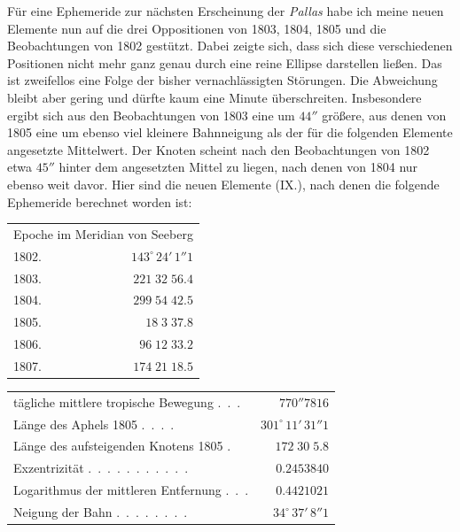 \par\indent Für eine Ephemeride zur nächsten Erscheinung der \emph{Pallas} habe ich meine neuen Elemente nun auf die drei Oppositionen von 1803, 1804, 1805 und die Beobachtungen von 1802 gestützt. Dabei zeigte sich, dass sich diese verschiedenen Positionen nicht mehr ganz genau durch eine reine Ellipse darstellen ließen. Das ist zweifellos eine Folge der bisher vernachlässigten Störungen. Die Abweichung bleibt aber gering und dürfte kaum eine Minute überschreiten. Insbesondere ergibt sich aus den Beobachtungen von 1803 eine um $44''$ größere, aus denen von 1805 eine um ebenso viel kleinere Bahnneigung als der für die folgenden Elemente angesetzte Mittelwert. Der Knoten scheint nach den Beobachtungen von 1802 etwa $45''$ hinter dem angesetzten Mittel zu liegen, nach denen von 1804 nur ebenso weit davor. Hier sind die neuen Elemente (IX.), nach denen die folgende Ephemeride berechnet worden ist:
\begin{center}\begingroup
\fontsize{9}{11}\selectfont
\setlength{\tabcolsep}{2pt}\renewcommand{\arraystretch}{1.12}
\begin{tabular}{lr}
\multicolumn{2}{c}{Epoche im Meridian von Seeberg} \\
1802. & $143^\circ\,24'\,1''1$ \\
1803. & $221\;32\;56.4$ \\
1804. & $299\;54\;42.5$ \\
1805. & $18\;3\;37.8$ \\
1806. & $96\;12\;33.2$ \\
1807. & $174\;21\;18.5$ \\
\end{tabular}\endgroup\end{center}
\begin{center}\begingroup
\fontsize{9}{11}\selectfont
\setlength{\tabcolsep}{2pt}\renewcommand{\arraystretch}{1.12}
\begin{tabular}{lr}
tägliche mittlere tropische Bewegung .\ .\ . & $770''7816$ \\
Länge des Aphels 1805 .\ .\ .\ . & $301^\circ\,11'\,31''1$ \\
Länge des aufsteigenden Knotens 1805 . & $172\;30\;5.8$ \\
Exzentrizität .\ .\ .\ .\ .\ .\ .\ .\ .\ .\ . & $0.2453840$ \\
Logarithmus der mittleren Entfernung .\ .\ . & $0.4421021$ \\
Neigung der Bahn .\ .\ .\ .\ .\ .\ .\ . & $34^\circ\,37'\,8''1$ \\
\end{tabular}\endgroup\end{center}

